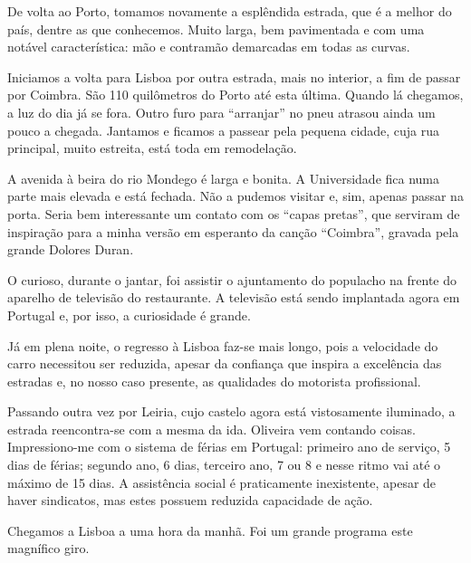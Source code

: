 De volta ao Porto, tomamos novamente a esplêndida estrada, que é a melhor do país, dentre as que conhecemos. Muito larga, bem pavimentada e com uma notável característica: mão e contramão demarcadas em todas as curvas.

Iniciamos a volta para Lisboa por outra estrada, mais no interior, a fim de passar por Coimbra. São 110 quilômetros do Porto até esta última. Quando lá chegamos, a luz do dia já se fora. Outro furo para ``arranjar'' no pneu atrasou ainda um pouco a chegada. Jantamos e ficamos a passear pela pequena cidade, cuja rua principal, muito estreita, está toda em remodelação.

A avenida à beira do rio Mondego é larga e bonita. A Universidade fica numa parte mais elevada e está fechada. Não a pudemos visitar e, sim, apenas passar na porta. Seria bem interessante um contato com os ``capas pretas'', que serviram de inspiração para a minha versão em esperanto da canção ``Coimbra'', gravada pela grande Dolores Duran.

O curioso, durante o jantar, foi assistir o ajuntamento do populacho na frente do aparelho de televisão do restaurante. A televisão está sendo implantada agora em Portugal e, por isso, a curiosidade é grande.

Já em plena noite, o regresso à Lisboa faz-se mais longo, pois a velocidade do carro necessitou ser reduzida, apesar da confiança que inspira a excelência das estradas e, no nosso caso presente, as qualidades do motorista profissional.

Passando outra vez por Leiria, cujo castelo agora está vistosamente iluminado, a estrada reencontra-se com a mesma da ida. Oliveira vem contando coisas. Impressiono-me com o sistema de férias em Portugal: primeiro ano de serviço, 5 dias de férias; segundo ano, 6 dias, terceiro ano, 7 ou 8 e nesse ritmo vai até o máximo de 15 dias. A assistência social é praticamente inexistente, apesar de haver sindicatos, mas estes possuem reduzida capacidade de ação.

Chegamos a Lisboa a uma hora da manhã. Foi um grande programa este magnífico giro.
